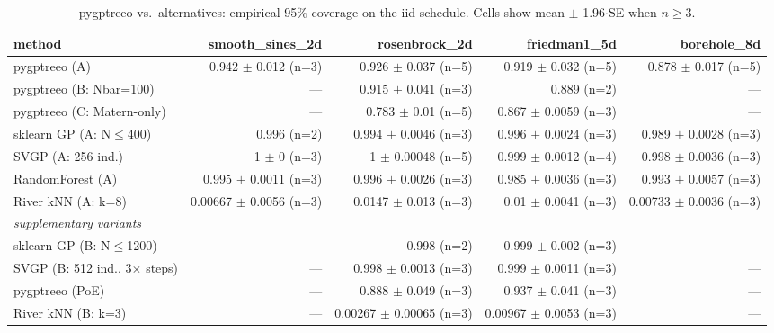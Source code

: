 \begin{table}[h]
\centering
\caption{pygptreeo vs.\ alternatives: empirical 95\% coverage on the iid schedule. Cells show mean $\pm$ 1.96$\cdot$SE when $n\geq 3$.}
\begin{tabular}{lrrrr}
\toprule
method & smooth\_sines\_2d & rosenbrock\_2d & friedman1\_5d & borehole\_8d \\
\midrule
pygptreeo (A) & 0.942 $\pm$ 0.012 (n=3) & 0.926 $\pm$ 0.037 (n=5) & 0.919 $\pm$ 0.032 (n=5) & 0.878 $\pm$ 0.017 (n=5) \\
pygptreeo (B: Nbar=100) & --- & 0.915 $\pm$ 0.041 (n=3) & 0.889 (n=2) & --- \\
pygptreeo (C: Matern-only) & --- & 0.783 $\pm$ 0.01 (n=5) & 0.867 $\pm$ 0.0059 (n=3) & --- \\
sklearn GP (A: N$\leq$400) & 0.996 (n=2) & 0.994 $\pm$ 0.0046 (n=3) & 0.996 $\pm$ 0.0024 (n=3) & 0.989 $\pm$ 0.0028 (n=3) \\
SVGP (A: 256 ind.) & 1 $\pm$ 0 (n=3) & 1 $\pm$ 0.00048 (n=5) & 0.999 $\pm$ 0.0012 (n=4) & 0.998 $\pm$ 0.0036 (n=3) \\
RandomForest (A) & 0.995 $\pm$ 0.0011 (n=3) & 0.996 $\pm$ 0.0026 (n=3) & 0.985 $\pm$ 0.0036 (n=3) & 0.993 $\pm$ 0.0057 (n=3) \\
River kNN (A: k=8) & 0.00667 $\pm$ 0.0056 (n=3) & 0.0147 $\pm$ 0.013 (n=3) & 0.01 $\pm$ 0.0041 (n=3) & 0.00733 $\pm$ 0.0036 (n=3) \\
\midrule
\multicolumn{5}{l}{\textit{supplementary variants}} \\
sklearn GP (B: N$\leq$1200) & --- & 0.998 (n=2) & 0.999 $\pm$ 0.002 (n=3) & --- \\
SVGP (B: 512 ind., 3$\times$ steps) & --- & 0.998 $\pm$ 0.0013 (n=3) & 0.999 $\pm$ 0.0011 (n=3) & --- \\
pygptreeo (PoE) & --- & 0.888 $\pm$ 0.049 (n=3) & 0.937 $\pm$ 0.041 (n=3) & --- \\
River kNN (B: k=3) & --- & 0.00267 $\pm$ 0.00065 (n=3) & 0.00967 $\pm$ 0.0053 (n=3) & --- \\
\bottomrule
\end{tabular}
\end{table}

